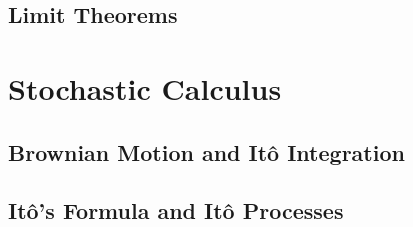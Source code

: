 



\subsection{Limit Theorems}






\section{Stochastic Calculus}

\subsection{Brownian Motion and Itô Integration}





\subsection{Itô's Formula and Itô Processes}





